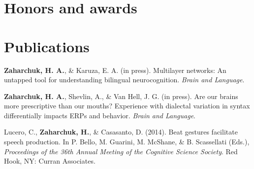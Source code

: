\documentclass[11pt, a4paper]{awesome-cv}
\begin{document}
\hypertarget{honors-and-awards}{%
\section{Honors and awards}\label{honors-and-awards}}

\begin{cventries}
    \vspace{-4.0mm}
    \vspace{-4.0mm}
    \vspace{-4.0mm}
    \vspace{-4.0mm}
\end{cventries}

\hypertarget{publications}{%
\section{Publications}\label{publications}}

\setlength{\parindent}{-0.2in}
\setlength{\leftskip}{0.2in}

\noindent

\hypertarget{refs_main}{}
\leavevmode\hypertarget{ref-2}{}%
\textbf{\textbf{Zaharchuk, H.} A.}, \& Karuza, E. A. (in press). Multilayer networks: An
untapped tool for understanding bilingual neurocognition. \emph{Brain
and Language}.

\leavevmode\hypertarget{ref-3}{}%
\textbf{\textbf{Zaharchuk, H.} A.}, Shevlin, A., \& Van Hell, J. G. (in press). Are our
brains more prescriptive than our mouths? Experience with dialectal
variation in syntax differentially impacts {ERPs} and behavior.
\emph{Brain and Language}.

\leavevmode\hypertarget{ref-1}{}%
Lucero, C., \textbf{Zaharchuk, H.}, \& Casasanto, D. (2014). Beat gestures
facilitate speech production. In P. Bello, M. Guarini, M. McShane, \& B.
Scassellati (Eds.), \emph{{Proceedings of the 36th Annual Meeting of the
Cognitive Science Society}}. Red Hook, NY: Curran Associates.
\end{document}

